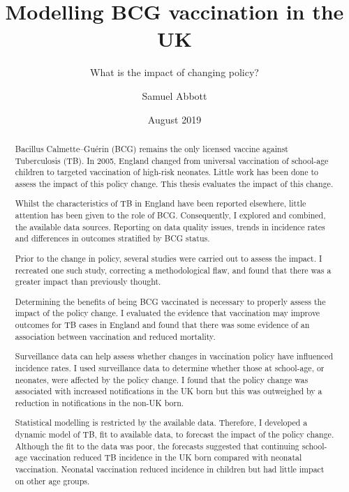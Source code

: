 \documentclass[11pt,twoside]{bristolthesis}
\title{Modelling BCG vaccination in the UK}
\subtitle{What is the impact of changing policy?}
\author{Samuel Abbott}
\date{August 2019}
\begin{document}
  \maketitle

  \frontmatter %

      \begin{abstract}
      Bacillus Calmette--Guérin (BCG) remains the only licensed vaccine against Tuberculosis (TB). In 2005, England changed from universal vaccination of school-age children to targeted vaccination of high-risk neonates. Little work has been done to assess the impact of this policy change. This thesis evaluates the impact of this change.
      
      \par
      
      Whilst the characteristics of TB in England have been reported elsewhere, little attention has been given to the role of BCG. Consequently, I explored and combined, the available data sources. Reporting on data quality issues, trends in incidence rates and differences in outcomes stratified by BCG status.
      
      \par
      
      Prior to the change in policy, several studies were carried out to assess the impact. I recreated one such study, correcting a methodological flaw, and found that there was a greater impact than previously thought.
      
      \par
      
      Determining the benefits of being BCG vaccinated is necessary to properly assess the impact of the policy change. I evaluated the evidence that vaccination may improve outcomes for TB cases in England and found that there was some evidence of an association between vaccination and reduced mortality.
      
      \par
      
      Surveillance data can help assess whether changes in vaccination policy have influenced incidence rates. I used surveillance data to determine whether those at school-age, or neonates, were affected by the policy change. I found that the policy change was associated with increased notifications in the UK born but this was outweighed by a reduction in notifications in the non-UK born.
      
      \par
      
      Statistical modelling is restricted by the available data. Therefore, I developed a dynamic model of TB, fit to available data, to forecast the impact of the policy change. Although the fit to the data was poor, the forecasts suggested that continuing school-age vaccination reduced TB incidence in the UK born compared with neonatal vaccination. Neonatal vaccination reduced incidence in children but had little impact on other age groups.
      
      \par
    \end{abstract}
\end{document}
